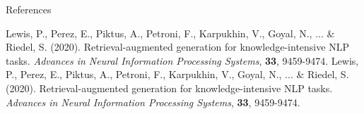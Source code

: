\documentclass{beamer}
\begin{document}
\begin{frame}{References}
    \begin{thebibliography}{9}
        Lewis, P., Perez, E., Piktus, A., Petroni, F., Karpukhin, V., Goyal, N., ... \& Riedel, S. (2020). Retrieval-augmented generation for knowledge-intensive NLP tasks. \textit{Advances in Neural Information Processing Systems}, \textbf{33}, 9459-9474.
        Lewis, P., Perez, E., Piktus, A., Petroni, F., Karpukhin, V., Goyal, N., ... \& Riedel, S. (2020). Retrieval-augmented generation for knowledge-intensive NLP tasks. \textit{Advances in Neural Information Processing Systems}, \textbf{33}, 9459-9474.
    \end{thebibliography}
\end{frame}
\end{document}
